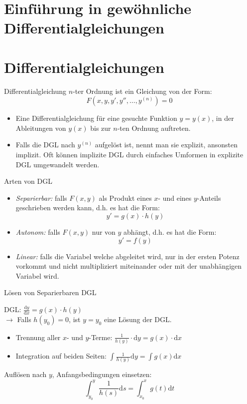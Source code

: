 \section{Einführung in gewöhnliche Differentialgleichungen}

\section{Differentialgleichungen}

\begin{definition}{Differentialgleichung}
  \(n\)-ter Ordnung ist ein Gleichung von der Form:
      \[F(x,y,y',y'',\ldots,y^{(n)})=0\]
  \begin{itemize}
    \item Eine Differentialgleichung 
      für eine gesuchte Funktion \(y=y(x)\), in der Ableitungen von \(y(x)\) bis zur \(n\)-ten Ordnung auftreten.
    \item Falls die DGL nach \(y^{(n)}\) aufgelöst ist, nennt man sie explizit, ansonsten implizit.
      Oft können implizite DGL durch einfaches Umformen in explizite DGL umgewandelt werden.
  \end{itemize}
\end{definition}

\begin{definition}{Arten von DGL}
  \begin{itemize}
    \item \emph{Separierbar:} falls \(F(x,y)\) als Produkt eines \(x\)- und eines \(y\)-Anteils geschrieben
      werden kann, d.h. es hat die Form:
      \[y'=g(x)\cdot h(y)\]
    \item \emph{Autonom:} falls \(F(x,y)\) nur von \(y\) abhängt, d.h. es hat die Form:
      \[y'=f(y)\]
    \item \emph{Linear:} falls die Variabel welche abgeleitet wird, nur in der ersten Potenz vorkommt und nicht
      multipliziert miteinander oder mit der unabhängigen Variabel wird.
  \end{itemize}
\end{definition}

\begin{KR}{Lösen von Separierbaren DGL}
  \begin{center}
    DGL:
      $\frac{\mathrm{d}y}{\mathrm{d}x}=g(x)\cdot h(y)$\\
      \vspace{1mm}
      $\rightarrow$ Falls \(h(y_0)=0\), ist \(y=y_0\) eine Lösung der DGL.
  \end{center}
  \begin{itemize}
    \item Trennung aller \(x\)- und \(y\)-Terme:
    $\frac{1}{h(y)}\cdot \mathrm{d}y=g(x)\cdot \mathrm{d}x$
    \item Integration auf beiden Seiten:
    $\int{\frac{1}{h(y)}\mathrm{d}y}=\int{g(x)\mathrm{d}x}$
    \end{itemize}
  Auflösen nach \(y\), Anfangsbedingungen einsetzen:
      \[\int_{y_0}^{y}{\frac{1}{h(s)}\mathrm{d}s}=\int_{x_0}^{x}{g(t)\mathrm{d}t}\]
\end{KR}

